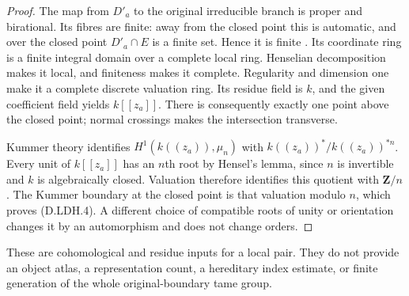 \begin{proof}
The map from $D'_a$ to the original irreducible branch is
proper and birational. Its fibres are finite: away from the
closed point this is automatic, and over the closed point
$D'_a\cap E$ is a finite set. Hence it is finite
\citep[Lemma~37.44.1, Tag~02LS]{StacksLocalPairCohomologyB}.
Its coordinate ring is a finite integral domain over a complete
local ring. Henselian decomposition makes it local, and
finiteness makes it complete. Regularity and dimension one
make it a complete discrete valuation ring. Its residue field
is $k$, and the given coefficient field yields $k[[z_a]]$.
There is consequently exactly one point above the closed point;
normal crossings makes the intersection transverse.

Kummer theory identifies $H^1(k((z_a)),\mu_n)$ with
$k((z_a))^*/k((z_a))^{*n}$. Every unit of $k[[z_a]]$ has an
$n$th root by Hensel's lemma, since $n$ is invertible and $k$
is algebraically closed. Valuation therefore identifies this
quotient with $\mathbf Z/n$. The Kummer boundary at the
closed point is that valuation modulo $n$, which proves
(D.LDH.4). A different choice of compatible roots of unity or
orientation changes it by an automorphism and does not change
orders.
\end{proof}

\begin{remark}
These are cohomological and residue inputs for a local pair.
They do not provide an object atlas, a representation count,
a hereditary index estimate, or finite generation of the
whole original-boundary tame group.
\end{remark}
